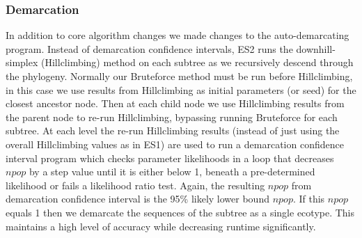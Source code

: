 \subsubsection*{Demarcation}
In addition to core algorithm changes we made changes to the auto-demarcating program.
Instead of demarcation confidence intervals, ES2 runs the downhill-simplex (Hillclimbing) method on each subtree as we recursively descend through the phylogeny.
Normally our Bruteforce method must be run before Hillclimbing, in this case we use results from Hillclimbing as initial parameters (or seed) for the closest ancestor node.
Then at each child node we use Hillclimbing results from the parent node to re-run Hillclimbing, bypassing running Bruteforce for each subtree.
At each level the re-run Hillclimbing results (instead of just using the overall Hillclimbing values as in ES1) are used to run a demarcation confidence interval program which checks parameter likelihoods in a loop that decreases $npop$ by a step value until it is either below 1, beneath a pre-determined likelihood or fails a likelihood ratio test.
Again, the resulting $npop$ from demarcation confidence interval is the 95\% likely lower bound $npop$.
If this $npop$ equals 1 then we demarcate the sequences of the subtree as a single ecotype.
This maintains a high level of accuracy while decreasing runtime significantly.

